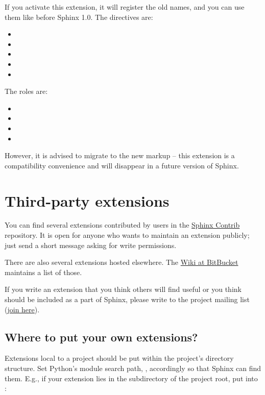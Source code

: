 \documentclass[letterpaper,10pt,english]{sphinxmanual}
\begin{document}
If you activate this extension, it will register the old names, and you can
use them like before Sphinx 1.0.  The directives are:
\begin{itemize}
\item {} 

\item {} 

\item {} 

\item {} 

\item {} 

\end{itemize}

The roles are:
\begin{itemize}
\item {} 

\item {} 

\item {} 

\item {} 

\end{itemize}

However, it is advised to migrate to the new markup -- this extension is a
compatibility convenience and will disappear in a future version of Sphinx.


\section{Third-party extensions}
\label{extensions:third-party-extensions}
You can find several extensions contributed by users in the \href{https://www.bitbucket.org/birkenfeld/sphinx-contrib}{Sphinx Contrib}
repository.  It is open for anyone who wants to maintain an extension
publicly; just send a short message asking for write permissions.

There are also several extensions hosted elsewhere.  The \href{https://www.bitbucket.org/birkenfeld/sphinx/wiki/Home}{Wiki at BitBucket}
maintains a list of those.

If you write an extension that you think others will find useful or you think
should be included as a part of Sphinx, please write to the project mailing
list (\href{http://groups.google.com/group/sphinx-dev}{join here}).


\subsection{Where to put your own extensions?}
\label{extensions:sphinx-contrib}\label{extensions:where-to-put-your-own-extensions}
Extensions local to a project should be put within the project's directory
structure.  Set Python's module search path, , accordingly so that
Sphinx can find them.
E.g., if your extension  lies in the  subdirectory of the
project root, put into :
\end{document}
